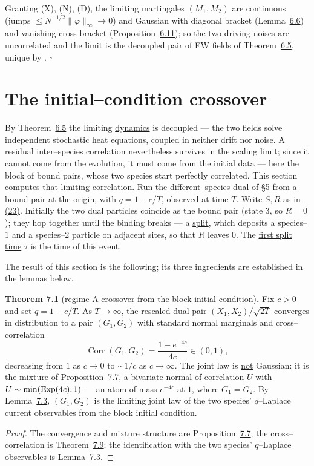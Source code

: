 \documentclass[11pt]{article}
\theoremstyle{plain}
\theoremstyle{definition}
\theoremstyle{remark}
\DeclareMathOperator{\Corr}{Corr}\DeclareMathOperator{\cum}{cum}
\begin{document}
\noindent Granting (X), (N), (D), the limiting martingales $(M_1,M_2)$ are continuous
(jumps $\le N^{-1/2}\|\varphi\|_\infty\to0$) and Gaussian with diagonal bracket
(Lemma~\hyperref[lem_gauss]{6.6}) and vanishing cross bracket (Proposition~\hyperref[prop_conc]{6.11}); so
the two driving noises are uncorrelated and the limit is the decoupled pair of EW
fields of Theorem~\hyperref[thm_ewmain]{6.5}, unique by \cite[Ch.~11]{KL}. \hfill$\square$

\section{The initial--condition crossover}\label{sec_cross}

By Theorem~\hyperref[thm_ewmain]{6.5} the limiting \underline{dynamics} is decoupled --- the two fields
solve independent stochastic heat equations, coupled in neither drift nor noise. A
residual inter--species correlation nevertheless survives in the scaling limit; since it
cannot come from the evolution, it must come from the initial data --- here the block of
bound pairs, whose two species start perfectly correlated. This section computes that
limiting correlation. Run the different--species dual of \S\hyperref[sec_kernel]{5} from a bound pair at
the origin, with $q=1-c/T$, observed at time $T$. Write $S,R$ as in \hyperref[eq_SR]{(23)}.
Initially the two dual particles coincide as the bound pair (state $3$, so $R=0$); they
hop together until the binding breaks --- a \underline{split}, which deposits a species--$1$
and a species--$2$ particle on adjacent sites, so that $R$ leaves $0$. The \underline{first
split time} $\tau$ is the time of this event.

The result of this section is the following; its three ingredients are established in the
lemmas below.

\label{thm_cross}\noindent\textbf{Theorem 7.1} (regime-A crossover from the block initial condition)\textbf{.} 
Fix $c>0$ and set $q=1-c/T$. As $T\to\infty$, the rescaled dual pair $(X_1,X_2)/\sqrt{2T}$
converges in distribution to a pair $(G_1,G_2)$ with standard normal marginals and
cross--correlation
\[
  \Corr(G_1,G_2)=\frac{1-e^{-4c}}{4c}\in(0,1),
\]
decreasing from $1$ as $c\to0$ to $\sim1/c$ as $c\to\infty$. The joint law is \underline{not}
Gaussian: it is the mixture of Proposition~\hyperref[prop_twophase]{7.7}, a bivariate normal of
correlation $U$ with $U\sim\min(\mathrm{Exp}(4c),1)$ --- an atom of mass $e^{-4c}$ at $1$, where
$G_1=G_2$. By Lemma~\hyperref[lem_crossbridge]{7.3}, $(G_1,G_2)$ is the limiting joint law of the
two species' $q$--Laplace current observables from the block initial condition.
\par
\begin{proof}
The convergence and mixture structure are Proposition~\hyperref[prop_twophase]{7.7}; the
cross--correlation is Theorem~\hyperref[thm_closed]{7.9}; the identification with the two species'
$q$--Laplace observables is Lemma~\hyperref[lem_crossbridge]{7.3}.
\end{proof}
\end{document}
